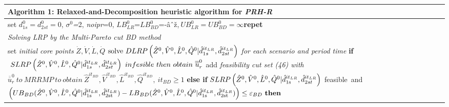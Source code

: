 \documentclass[review]{elsarticle}
\begin{document}
\begin{scriptsize}
\begin{tabular}{p{4.9in}} \hline 
\textbf{Algorithm 1}: Relaxed-and-Decomposition heuristic algorithm for \textit{PRH-R} \\ \hline 
set $d^0_{1s}=d^0_{2st}=0$, ${\sigma }^0$\textit{=}2, \textit{noipr}=0, ${LB}^0_{LR}$=${LB}^0_{BD}$=-âˆž,$\ {UB}^0_{LR}={UB}^0_{BD}=\infty $\newline \textbf{repet} \\ \hline 
\textit{Solving LRP by the Multi-Pareto cut BD method} \\ \hline 

set \textit{initial core points} $\dot{Z},\dot{V},\dot{L},\dot{Q}$\newline 
${\rm solve\ }DLRP\left({\hat{Z}}^0,{\hat{V}}^0,{\hat{L}}^0,{\hat{Q}}^0|{\hat{d}}^{{it}_{LR}}_{1s},{\hat{d}}^{it_{LR}}_{2st}\right)$\textit{ for each scenario and period time}\newline 
\textbf{  if}\textit{  }$\ SLRP\left({\hat{Z}}^0,{\hat{V}}^0,{\hat{L}}^0,{\hat{Q}}^0|{\hat{d}}^{it_{LR}}_{1s},{\hat{d}}^{it_{LR}}_{2st}\right)\ infesible{\rm \ }then{\rm \ }obtain\ {\overline{\overline{u}}}^0_r$\textit{\newline }
\textbf{       }add\textit{ feasibility cut set (46) with} ${\overline{\overline{u}}}^0_r\ to\ MRRMP\ to\ obtain\ {\hat{Z}}^{{it}_{BD}},{\hat{V}}^{it_{BD}},{\hat{L}}^{it_{BD}},{\hat{Q}}^{it_{BD}},\ {it}_{BD}\ge 1$\newline
 \textbf{   else if} $SLRP\left({\hat{Z}}^0,{\hat{V}}^0,{\hat{L}}^0,{\hat{Q}}^0|{\hat{d}}^{it_{LR}}_{{\rm 1s}},{\hat{d}}^{it_{LR}}_{2st}\right) $ feasible\ and \newline 
$ \left({UB}_{BD} ({\hat{Z}}^0,{\hat{V}}^0,{\hat{L}}^0,{\hat{Q}}^0|{\hat{d}}^{it_{LR}}_{{\rm 1s}},{\hat{d}}^{it_{LR}}_{{\rm 2st}} ) -{LB}_{BD}{\rm (}{\hat{Z}}^0,{\hat{V}}^0,{\hat{L}}^0,{\hat{Q}}^0|{\hat{d}}^{it_{LR}}_{{\rm 1s}},{\hat{d}}^{it_{LR}}_{{\rm 2st}}{\rm )} \right)\le {\varepsilon }_{BD}\ \mathbf{ then}$\newline 
 

\end{tabular}
\end{scriptsize}
\end{document}
